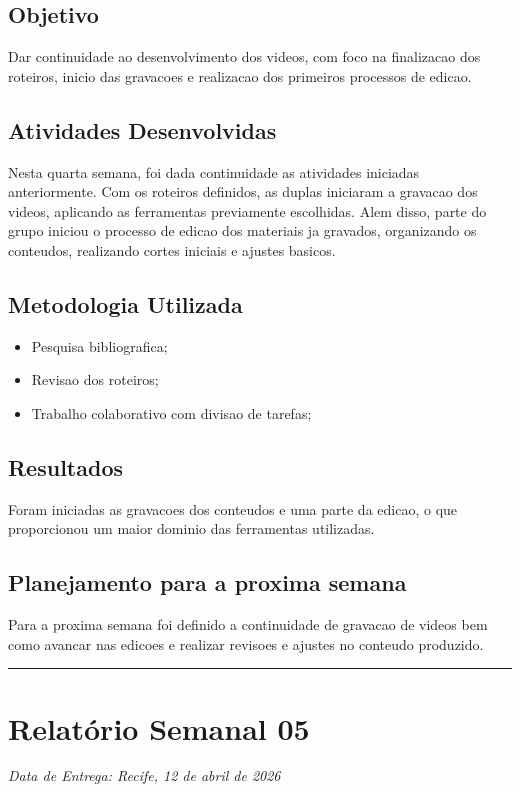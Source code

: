 \subsection{Objetivo}
Dar continuidade ao desenvolvimento dos videos, com foco na finalizacao dos roteiros, inicio das gravacoes e realizacao dos primeiros processos de edicao.

\subsection{Atividades Desenvolvidas}
Nesta quarta semana, foi dada continuidade as atividades iniciadas anteriormente. Com os roteiros definidos, as duplas iniciaram a gravacao dos videos, aplicando as ferramentas previamente escolhidas. Alem disso, parte do grupo iniciou o processo de edicao dos materiais ja gravados, organizando os conteudos, realizando cortes iniciais e ajustes basicos.

\subsection{Metodologia Utilizada}
\begin{itemize}
    \item Pesquisa bibliografica;
    \item Revisao dos roteiros;
    \item Trabalho colaborativo com divisao de tarefas;
\end{itemize}

\subsection{Resultados}
Foram iniciadas as gravacoes dos conteudos e uma parte da edicao, o que proporcionou um maior dominio das ferramentas utilizadas.

\subsection{Planejamento para a proxima semana}
Para a proxima semana foi definido a continuidade de gravacao de videos bem como avancar nas edicoes e realizar revisoes e ajustes no conteudo produzido.

\bigskip
\hrule
\bigskip

\section{Relatório Semanal 05}
{\centering\noindent\textit{Data de Entrega: Recife, 12 de abril de 2026}\par}\bigskip

